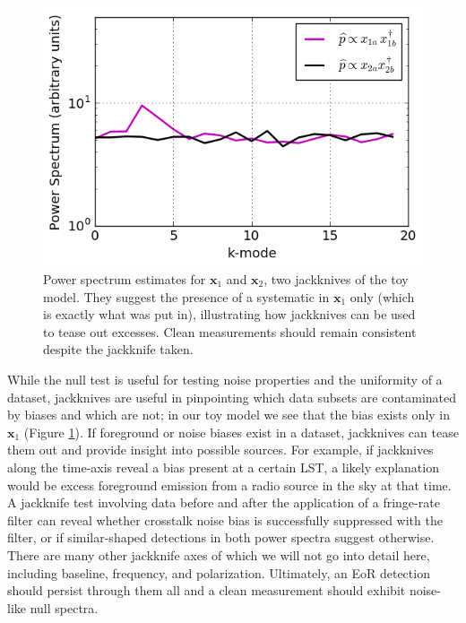 \documentclass[preprint2,numberedappendix,tighten]{aastex6}  %
\begin{document}
\begin{figure}
	\centering
	\includegraphics[trim={0cm 0cm 0cm 0cm},width=\columnwidth]{plots/toy_bias2.png}
	\caption{Power spectrum estimates for $\textbf{x}_{1}$ and $\textbf{x}_{2}$, two jackknives of the toy model. They suggest 
the presence of a systematic in $\textbf{x}_{1}$ only (which is exactly what was put in), illustrating how jackknives can be used to tease out excesses. Clean 
measurements should remain consistent despite the jackknife taken.}
	\label{fig:toy_bias2}
\end{figure}

While the null test is useful for testing noise properties and the uniformity of a dataset, jackknives are useful in pinpointing 
which data subsets are contaminated by biases and which are not; in our toy model we see that the bias exists only in $
\textbf{x}_{1}$ (Figure \ref{fig:toy_bias2}). If foreground or noise biases exist in a dataset, jackknives can tease them out and 
provide insight into possible sources. For example, if jackknives along the time-axis reveal a bias present at a certain LST, a 
likely explanation would be excess foreground emission from a radio source in the sky at that time. A jackknife test involving 
data before and after the application of a fringe-rate filter can reveal whether crosstalk noise bias is successfully suppressed 
with the filter, or if similar-shaped detections in both power spectra suggest otherwise. There are many other jackknife axes of 
which we will not go into detail here, including baseline, frequency, and polarization. Ultimately, an EoR detection should persist 
through them all and a clean measurement should exhibit noise-like null spectra.
\end{document}
